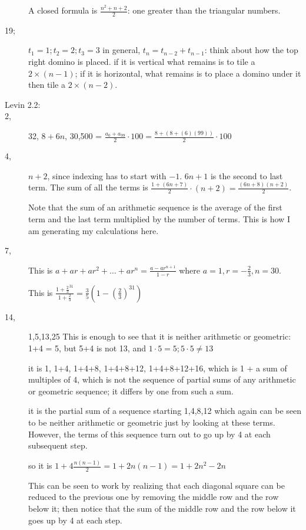 \documentclass[12pt]{article}
\begin{document}
\begin{description}
A closed formula is $\frac{n^2+n+2}2$:  one greater than the triangular numbers.

 \item[19; ] $t_1=1;t_2=2;t_3=3$  in general, $t_{n} = t_{n-2} + t_{n-1}$:  think about how the top right domino is placed.
if it is vertical what remains is to tile a $2 \times (n-1)$;  if it is horizontal, what remains is to place a domino under it
then tile a $2 \times (n-2)$.

\item[Levin 2.2:]

\item[ 2,]  32, $8+6n$, 30,500 = $\frac{a_0+a_99}2\cdot 100 = \frac{8+(8+(6)(99))}2\cdot 100$

\item[ 4,]  $n+2$, since indexing has to start with $-1$.  $6n+1$ is the second to last term.  The sum of all the terms is
$\frac{1 + (6n+7)}2 \cdot (n+2) = \frac{(6n+8)(n+2)}2$.

Note that the sum of an arithmetic sequence is the average of the first term and the last term multiplied by the number of terms.  This is how I am generating my calculations here.

\item[ 7,]   This is $a+ar+ar^2+\ldots+ar^n = \frac{a -ar^{n+1}}{1-r}$ where $a=1, r=-\frac 23, n=30$.

This is $\frac{1+\frac23^{31}}{1+\frac 23} = \frac35(1-(\frac 23)^{31})$

\item[ 14, ]  1,5,13,25  This is enough to see that it is neither arithmetic or geometric:  1+4 = 5, but 5+4 is not 13, and
$1 \cdot 5 = 5; 5 \cdot 5 \neq 13$

it is 1, 1+4, 1+4+8, 1+4+8+12, 1+4+8+12+16, which is 1 + a sum of multiples of 4, which is not
the sequence of partial sums of any arithmetic or geometric sequence; it differs by one from such a sum.

it is the partial sum of a sequence starting 1,4,8,12  which again can be seen to be neither arithmetic or geometric
just by looking at these terms.  However, the terms of this sequence turn out to go up by 4 at each subsequent step.

so it is $1 + 4\frac{n(n-1)}2= 1+2n(n-1) = 1+2n^2-2n$

This can be seen to work by realizing that each diagonal square can be reduced to the previous one by removing the middle row and the row below it;  then notice that the sum of the middle row and the row below it goes up by 4 at each step.


\end{description}
\end{document}
